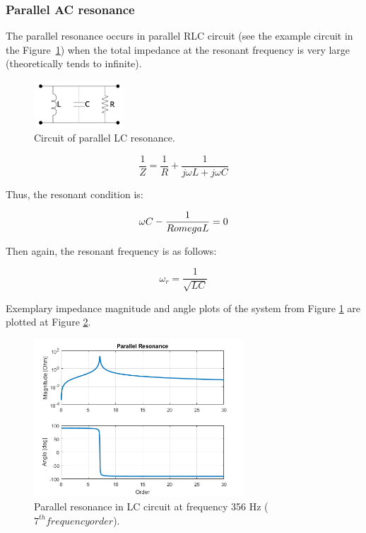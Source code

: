 \documentclass[12pt]{report} %
\begin{document}
\subsubsection{Parallel AC resonance}
The parallel resonance occurs in parallel RLC circuit (see the example circuit in the Figure~\ref{fig:parallelcircuit}) when the total impedance at the resonant frequency is very large (theoretically tends to infinite).

\begin{figure}[htb]
	\centering
    	\includegraphics[width=0.3\textwidth]{img/theory/parallel_circ.png}
  	\caption{Circuit of parallel LC resonance.}
  	\label{fig:parallelcircuit}
\end{figure}
\FloatBarrier

\begin{equation}
	\dfrac{1}{Z}=\dfrac{1}{R}+\dfrac{1}{j\omega L+j\omega C}
\end{equation}

Thus, the resonant condition is:

\begin{equation}
	\omega C-\dfrac{1}{R\\omega L}=0
\end{equation}

Then again, the resonant frequency is as follows:

\begin{equation}
	\omega_r =\dfrac{1}{\sqrt{LC}}
\end{equation}

Exemplary impedance magnitude and angle plots of the system from Figure \ref{fig:parallelcircuit} are plotted at Figure \ref{fig:parallelresonance}.

\begin{figure}[htb]
	\centering
    	\includegraphics[width=0.7\textwidth]{img/theory/parallel_resonance_f356.png}
  	\caption{Parallel resonance in LC circuit at frequency 356 Hz ($7^{th} frequency order$).}
  	\label{fig:parallelresonance}
\end{figure}
\FloatBarrier
\end{document}
